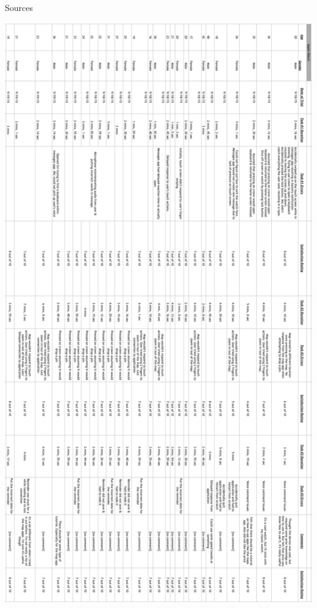 \documentclass[paper=a4, fontsize=11pt]{scrartcl}	%
\numberwithin{equation}{section}															%
\numberwithin{figure}{section}																%
\numberwithin{table}{section}																%
\begin{document}
\begin{center}
Sources
\end{center}
\includegraphics[scale=0.45]{sources1}
\newpage
\end{document}
